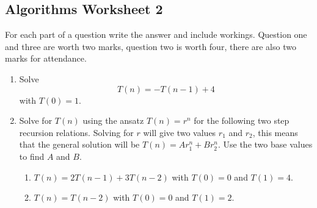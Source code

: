 \documentclass[11pt,a4paper]{scrartcl}
\newif\ifanswers
\begin{document}
\subsection*{Algorithms Worksheet 2}

For each part of a question write the answer and include
workings. Question one and three are worth two marks, question two is
worth four, there are also two marks for attendance.

\begin{enumerate}

\item Solve
\begin{equation}
T(n)=-T(n-1)+4
\end{equation}
with $T(0)=1$. 

\ifanswers

\noindent Solution:

Substitute in $T(n)=A(-1)^n+B$ to get
\begin{equation}
A(-1!)^n+B=-A(-1)^{n-1)-B+4
\end{equation}
so $2B=4$ or $B=2$; now $T(n)=A(-1)^n+2$ so $1=T(0)=A+2$ and hence $A=-1$.

\fi

\item Solve for $T(n)$ using the ansatz $T(n)=r^n$ for the following
  two step recursion relations. Solving for $r$ will give two values
  $r_1$ and $r_2$, this means that the general solution will be
  $T(n)=Ar_1^n+Br_2^n$. Use the two base values to find $A$ and $B$. 

\begin{enumerate}
\item $T(n)=2T(n-1)+3T(n-2)$ with $T(0)=0$ and $T(1)=4$.
\item $T(n)=T(n-2)$ with $T(0)=0$ and $T(1)=2$.
\end{enumerate}


\ifanswers 

\noindent Solution:

For (a) we have 
\begin{equation}
r^2=2r+3
\end{equation}
so $r^2-2r-3=0$ or $(r-3)(r+1)=0$ so
\begin{equation}
T(n)=3^nA+(-1)^nB
\end{equation}
and the initial conditions give $A+B=0$ and $3A-B=4$ so 
\begin{equation}
T(n)=3^n-(-1)^n
\end{equation}
For (b) we get $r^2=1$ so 
\begin{equation}
T(n)=A+(-1)^nB
\end{equation}
and the initial conditions give $A+B=0$ and $A-B=2$ so
\begin{equation}
T(n)=1-(-1)^n
\end{equation}
\fi


\end{enumerate}
\end{document}
